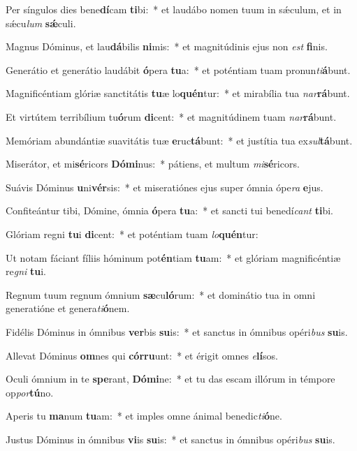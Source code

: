 \item Per síngulos dies bene\textbf{dí}cam \textbf{ti}bi:~* et laudábo nomen tuum in sǽculum, et in sǽcu\textit{lum} \textbf{sǽ}culi.
\item Magnus Dóminus, et lau\textbf{dá}bilis \textbf{ni}mis:~* et magnitúdinis ejus non \textit{est} \textbf{fi}nis.
\item Generátio et generátio laudábit \textbf{ó}pera \textbf{tu}a:~* et poténtiam tuam pronun\textit{ti}\textbf{á}bunt.
\item Magnificéntiam glóriæ sanctitátis \textbf{tu}æ lo\textbf{quén}tur:~* et mirabília tua \textit{nar}\textbf{rá}bunt.
\item Et virtútem terribílium tu\textbf{ó}rum \textbf{di}cent:~* et magnitúdinem tuam \textit{nar}\textbf{rá}bunt.
\item Memóriam abundántiæ suavitátis tuæ \textbf{e}ruc\textbf{tá}bunt:~* et justítia tua ex\textit{sul}\textbf{tá}bunt.
\item Miserátor, et mi\textbf{sé}ricors \textbf{Dó}\textbf{mi}nus:~* pátiens, et multum \textit{mi}\textbf{sé}ricors.
\item Suávis Dóminus \textbf{u}ni\textbf{vér}sis:~* et miseratiónes ejus super ómnia ópe\textit{ra} \textbf{e}jus.
\item Confiteántur tibi, Dómine, ómnia \textbf{ó}pera \textbf{tu}a:~* et sancti tui benedí\textit{cant} \textbf{ti}bi.
\item Glóriam regni \textbf{tu}i \textbf{di}cent:~* et poténtiam tuam \textit{lo}\textbf{quén}tur:
\item Ut notam fáciant fíliis hóminum pot\textbf{én}tiam \textbf{tu}am:~* et glóriam magnificéntiæ re\textit{gni} \textbf{tu}i.
\item Regnum tuum regnum ómnium \textbf{sæ}cu\textbf{ló}rum:~* et dominátio tua in omni generatióne et genera\textit{ti}\textbf{ó}nem.
\item Fidélis Dóminus in ómnibus \textbf{ver}bis \textbf{su}is:~* et sanctus in ómnibus opéri\textit{bus} \textbf{su}is.
\item Allevat Dóminus \textbf{om}nes qui \textbf{cór}\textbf{ru}unt:~* et érigit omnes \textit{e}\textbf{lí}sos.
\item Oculi ómnium in te \textbf{spe}rant, \textbf{Dó}\textbf{mi}ne:~* et tu das escam illórum in témpore op\textit{por}\textbf{tú}no.
\item Aperis tu \textbf{ma}num \textbf{tu}am:~* et imples omne ánimal benedic\textit{ti}\textbf{ó}ne.
\item Justus Dóminus in ómnibus \textbf{vi}is \textbf{su}is:~* et sanctus in ómnibus opéri\textit{bus} \textbf{su}is.
